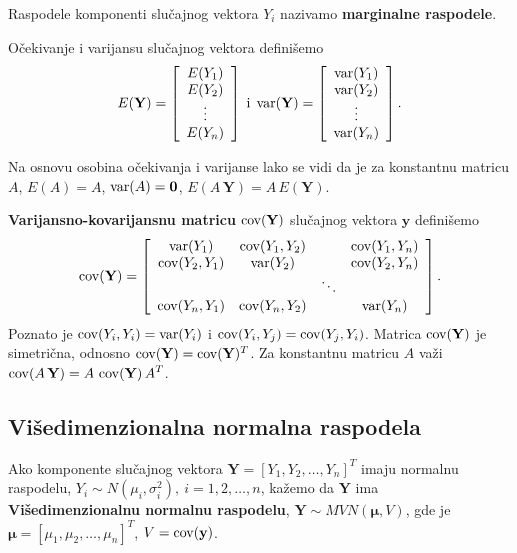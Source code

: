 \documentclass[twoside,titlepage,12pt,a4paper]{book}
\def\var{\mathop{\rm var}\nolimits}
\def\cov{\mathop{\rm cov}\nolimits}
\numberwithin{equation}{chapter}
\begin{document}
Raspodele komponenti slučajnog vektora $Y_i$ nazivamo \textbf{marginalne raspodele}.

Očekivanje i varijansu slučajnog vektora definišemo
$$E ( \mathbf{Y} ) = \left[
\begin{array}{c}
E ( Y_1) \\
E ( Y_2) \\
\vdots \\
E ( Y_n) \\
\end{array} \right] \;\mbox{i}\; 
\var ( \mathbf{Y} ) = \left[
\begin{array}{c}
\var ( Y_1) \\
\var ( Y_2) \\
\vdots \\
\var ( Y_n) \\
\end{array} \right].$$

Na osnovu osobina očekivanja i varijanse lako se vidi da je
za konstantnu matricu $A$, $E(A) = A$,
$\var(A) = \mathbf{0}$, $E ( A \, \mathbf{Y} ) = A \,
E ( \mathbf{Y} )$.

\textbf{Varijansno-kovarijansnu matricu} $\cov ( \mathbf{Y} )$ slučajnog vektora $\mathbf{y}$
definišemo
\[
\cov ( \mathbf{Y} ) = \left[
\begin{array}{cccc}
\var ( Y_1 )      & \cov ( Y_1, Y_2 ) &        & \cov ( Y_1, Y_n )\\
\cov ( Y_2, Y_1 ) & \var ( Y_2 )      &        & \cov ( Y_2, Y_n )\\
                  &                   & \ddots &                  \\
\cov ( Y_n, Y_1 ) & \cov ( Y_n, Y_2 ) &        & \var ( Y_n )     \\
\end{array}
\right].
\]
Poznato je $\cov ( Y_i, Y_i ) = \var ( Y_i )$ i 
$\cov ( Y_i, Y_j ) = \cov ( Y_j, Y_i )$.
Matrica $\cov ( \mathbf{Y} )$ je simetrična, odnosno
$\cov ( \mathbf{Y} ) = \cov ( \mathbf{Y} )^T$.
Za konstantnu matricu $A$ važi
$\displaystyle \cov ( A \, \mathbf{Y} ) = A \, \cov ( \mathbf{Y} ) \, A^T$.

\subsection{Višedimenzionalna normalna raspodela}

Ako komponente slučajnog vektora $\mathbf{Y} = [ Y_1, Y_2, \ldots, Y_n ]^T$ imaju normalnu raspodelu, $Y_i \sim N ( \mu_i, \sigma_i^2 ), \: i = 1, 2, \ldots, n$, 
kažemo da $\mathbf{Y}$ ima \textbf{Višedimenzionalnu normalnu raspodelu},
$\mathbf{Y} \sim MVN ( \boldsymbol{\mu}, V )$, gde je $\boldsymbol{\mu} = [ \mu_1, \mu_2, \ldots, \mu_n ]^T$, $V = \cov ( \mathbf{y} )$.
\end{document}
